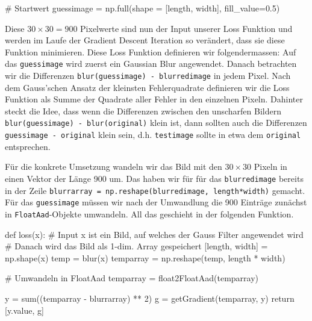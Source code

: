 \documentclass[
  a4paper,
  DIV=11]{scrreprt}
\newenvironment{Shaded}{\begin{snugshade}}{\end{snugshade}}
\newcommand{\BuiltInTok}[1]{\textcolor[rgb]{0.00,0.23,0.31}{#1}}
\newcommand{\CommentTok}[1]{\textcolor[rgb]{0.37,0.37,0.37}{#1}}
\newcommand{\ControlFlowTok}[1]{\textcolor[rgb]{0.00,0.23,0.31}{#1}}
\newcommand{\DecValTok}[1]{\textcolor[rgb]{0.68,0.00,0.00}{#1}}
\newcommand{\FloatTok}[1]{\textcolor[rgb]{0.68,0.00,0.00}{#1}}
\newcommand{\KeywordTok}[1]{\textcolor[rgb]{0.00,0.23,0.31}{#1}}
\newcommand{\NormalTok}[1]{\textcolor[rgb]{0.00,0.23,0.31}{#1}}
\newcommand{\OperatorTok}[1]{\textcolor[rgb]{0.37,0.37,0.37}{#1}}
\theoremstyle{definition}
\theoremstyle{definition}
\theoremstyle{remark}
\begin{document}
\begin{Shaded}
\begin{Highlighting}[]
\CommentTok{\# Startwert}
\NormalTok{guessimage }\OperatorTok{=}\NormalTok{ np.full(shape }\OperatorTok{=}\NormalTok{ [length, width], fill\_value}\OperatorTok{=}\FloatTok{0.5}\NormalTok{)}
\end{Highlighting}
\end{Shaded}

Diese \(30\times30=900\) Pixelwerte sind nun der Input unserer Loss
Funktion und werden im Laufe der Gradient Descent Iteration so
verändert, dass sie diese Funktion minimieren. Diese Loss Funktion
definieren wir folgendermassen: Auf das \texttt{guessimage} wird zuerst
ein Gaussian Blur angewendet. Danach betrachten wir die Differenzen
\texttt{blur(guessimage)\ -\ blurredimage} in jedem Pixel. Nach dem
Gauss'schen Ansatz der kleinsten Fehlerquadrate definieren wir die Loss
Funktion als Summe der Quadrate aller Fehler in den einzelnen Pixeln.
Dahinter steckt die Idee, dass wenn die Differenzen zwischen den
unscharfen Bildern \texttt{blur(guessimage)\ -\ blur(original)} klein
ist, dann sollten auch die Differenzen \texttt{guessimage\ -\ original}
klein sein, d.h. \texttt{testimage} sollte in etwa dem \texttt{original}
entsprechen.

Für die konkrete Umsetzung wandeln wir das Bild mit den \(30\times30\)
Pixeln in einen Vektor der Länge 900 um. Das haben wir für für das
\texttt{blurredimage} bereits in der Zeile
\texttt{blurrarray\ =\ np.reshape(blurredimage,\ length*width)} gemacht.
Für das \texttt{guessimage} müssen wir nach der Umwandlung die 900
Einträge zunächst in \texttt{FloatAad}-Objekte umwandeln. All das
geschieht in der folgenden Funktion.

\begin{Shaded}
\begin{Highlighting}[]
\KeywordTok{def}\NormalTok{ loss(x):}
    \CommentTok{\# Input x ist ein Bild, auf welches der Gauss Filter angewendet wird}
    \CommentTok{\# Danach wird das Bild als 1{-}dim. Array gespeichert}
\NormalTok{    [length, width] }\OperatorTok{=}\NormalTok{ np.shape(x)}
\NormalTok{    temp }\OperatorTok{=}\NormalTok{ blur(x)}
\NormalTok{    temparray }\OperatorTok{=}\NormalTok{ np.reshape(temp, length }\OperatorTok{*}\NormalTok{ width)}

    \CommentTok{\# Umwandeln in FloatAad}
\NormalTok{    temparray }\OperatorTok{=}\NormalTok{ float2FloatAad(temparray)}

\NormalTok{    y }\OperatorTok{=} \BuiltInTok{sum}\NormalTok{((temparray }\OperatorTok{{-}}\NormalTok{ blurrarray) }\OperatorTok{**} \DecValTok{2}\NormalTok{)}
\NormalTok{    g }\OperatorTok{=}\NormalTok{ getGradient(temparray, y)}
    \ControlFlowTok{return}\NormalTok{ [y.value, g]}
\end{Highlighting}
\end{Shaded}
\end{document}
